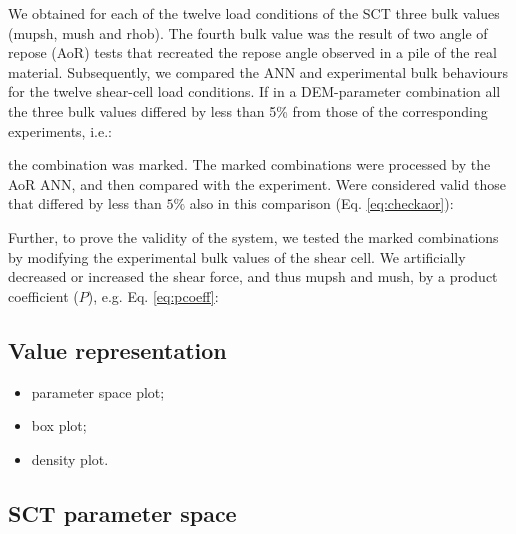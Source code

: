 We obtained for each of the twelve load conditions of the \acs{SCT} three bulk
values (\acs{mupsh}, \acs{mush} and \acs{rhob}).
The fourth bulk value was the result of two angle of repose (\acs{AoR}) tests that
recreated the repose angle observed in a pile of the
real material. 
Subsequently, we compared the \acs{ANN} and experimental bulk behaviours for the
twelve shear-cell load conditions.
If in a DEM-parameter combination all the three bulk values differed by less 
than 5\% from those of the corresponding experiments, i.e.:

the combination was marked. The marked combinations were processed by the
\acs{AoR} \acs{ANN}, and then compared with the experiment.
Were considered valid those that differed by less than $5\%$ also in this
comparison (Eq. \ref{eq:checkaor}):

Further, to prove the validity of the system, we tested the marked combinations
by modifying the experimental bulk values of the shear cell. 
We artificially decreased or increased the shear force, and thus \acs{mupsh} and
\acs{mush}, by a product coefficient ($P$), e.g. Eq. \ref{eq:pcoeff}:


\subsection{Value representation}
\label{subsec:valuerepresentation}

\begin{itemize}
  \item{parameter space plot;}
  \item{box plot;
  }
  \item{density plot.}
\end{itemize}




\subsection{SCT parameter space}
\label{subsec:sctparameterspace}

